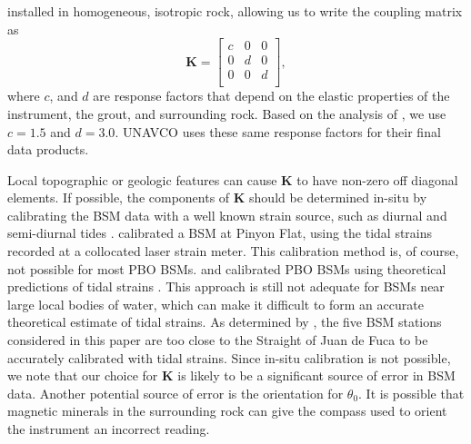 installed in homogeneous, isotropic rock, allowing us to write the
coupling matrix as
\begin{equation}\label{ch6:eq:CouplingMatrix}
\mathbf{K} = 
\left[\begin{array}{ccc}
c & 0 & 0 \\
0 & d & 0 \\
0 & 0 & d \\
\end{array}\right],
\end{equation}  
where $c$, and $d$ are response factors that depend on the elastic
properties of the instrument, the grout, and surrounding rock. Based
on the analysis of \citet{Gladwin1985}, we use $c=1.5$ and $d=3.0$.
UNAVCO uses these same response factors for their final data products.

Local topographic or geologic features can cause $\mathbf{K}$ to have
non-zero off diagonal elements. If possible, the components of
$\mathbf{K}$ should be determined in-situ by calibrating the BSM data
with a well known strain source, such as diurnal and semi-diurnal
tides \citep{Hart1996,Roeloffs2010,Hodgkinson2013}. \citet{Hart1996}
calibrated a BSM at Pinyon Flat, using the tidal strains recorded at a
collocated laser strain meter. This calibration method is, of course,
not possible for most PBO BSMs. \citet{Roeloffs2010} and
\citet{Hodgkinson2013} calibrated PBO BSMs using theoretical
predictions of tidal strains \citep[e.g.,][]{Agnew1997}. This approach
is still not adequate for BSMs near large local bodies of water, which
can make it difficult to form an accurate theoretical estimate of
tidal strains. As determined by \citet{Roeloffs2010}, the five BSM
stations considered in this paper are too close to the Straight of
Juan de Fuca to be accurately calibrated with tidal strains. Since
in-situ calibration is not possible, we note that our choice for
$\mathbf{K}$ is likely to be a significant source of error in BSM
data. Another potential source of error is the orientation for
$\theta_0$. It is possible that magnetic minerals in the surrounding
rock can give the compass used to orient the instrument an incorrect
reading.

